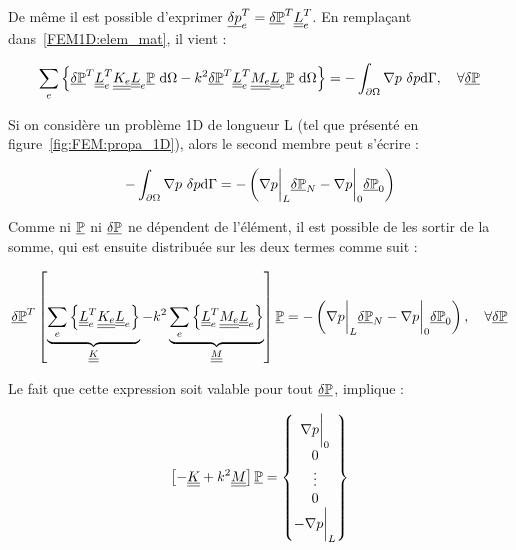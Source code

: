 De même il est possible d'exprimer $\ul{\DP}_e^T = \GDP^T\uul{L}_e^T$. En remplaçant dans~\eqref{FEM1D:elem_mat}, il
vient :

\begin{equation}
    \sum_e \left\{
	\GDP^T\uul{L}_e^T\uul{K_e}\uul{L}_e\GP~\dd\Omega - k^2 \GDP^T\uul{L}_e^T\uul{M_e}\uul{L}_e\GP~\dd\Omega \right\}
	= -\int_{\partial\Omega}\nabla p~\DP\dd\Gamma, \quad \forall\GDP\label{FEM1D:post_boolean}
\end{equation}


Si on considère un problème 1D de longueur L (tel que présenté en figure~\ref{fig:FEM:propa_1D}), alors le second membre
peut s'écrire :

$$-\int_{\partial\Omega}\nabla p~\DP\dd\Gamma = -\left(\nabla p\bigg|_L\GDP_N- \nabla p\bigg|_0\GDP_0\right)$$

Comme ni $\GP$ ni $\GDP$ ne dépendent de l'élément, il est possible de les sortir de la somme, qui est ensuite
distribuée sur les deux termes comme suit :

\begin{equation*}
	\GDP^T\left[\underbrace{\sum_e \left\{ \uul{L}_e^T\uul{K_e}\uul{L}_e\right\}}_{\uul{K}}
	- k^2 \underbrace{\sum_e\left\{\uul{L}_e^T\uul{M_e}\uul{L}_e\right\}}_{\uul{M}}\right]\GP
	= -\left(\nabla p\bigg|_L\GDP_N- \nabla p\bigg|_0\GDP_0\right), \quad \forall\GDP
\end{equation*}

Le fait que cette expression soit valable pour tout $\GDP$, implique :

\begin{equation}
\left[- \uul{K} + k^2\uul{M}\right]\GP = \begin{Bmatrix} \nabla p\bigg|_0\\0\\\vdots\\0\\-\nabla p\bigg|_L\end{Bmatrix} \label{FEM1D:final}
\end{equation}
